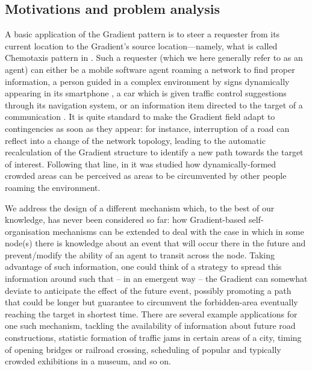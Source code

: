 \documentclass[12pt,a4paper,twoside,openright]{book}
\begin{document}
\subsection{Motivations and problem analysis}

A basic application of the Gradient pattern is to steer a requester from its current location to the Gradient's source location---namely, what is called Chemotaxis pattern in \cite{FDMVA-NACO2012}.
%
Such a requester (which we here generally refer to as an agent) can either be a mobile software agent roaming a network to find proper information, a person guided in a complex environment by signs dynamically appearing in its smartphone \cite{mass2011}, a car which is given traffic control suggestions through its navigation system, or an information item directed to the target of a communication \cite{VCMZ-TAAS2011}.
%
It is quite standard to make the Gradient field adapt to contingencies as soon as they appear: for instance, interruption of a road can reflect into a change of the network topology, leading to the automatic recalculation of the Gradient structure to identify a new path towards the target of interest.
%
Following that line, in \cite{sapereecolaws-sac2012} it was studied how dynamically-formed crowded areas can be perceived as areas to be circumvented by other people roaming the environment.

We address the design of a different mechanism which, to the best of our knowledge, has never been considered so far: how Gradient-based self-organisation mechanisms can be extended to deal with the case in which in some node(s) there is knowledge about an event that will occur there in the future and prevent/modify the ability of an agent to transit across the node.
%
Taking advantage of such information, one could think of a strategy to spread this information around such that -- in an emergent way -- the Gradient can somewhat deviate to anticipate the effect of the future event, possibly promoting a path that could be longer but guarantee to circumvent the forbidden-area eventually reaching the target in shortest time.
%
There are several example applications for one such mechanism, tackling the availability of information about future road constructions, statistic formation of traffic jams in certain areas of a city, timing of opening bridges or railroad crossing, scheduling of popular and typically crowded exhibitions in a museum, and so on.
\end{document}
